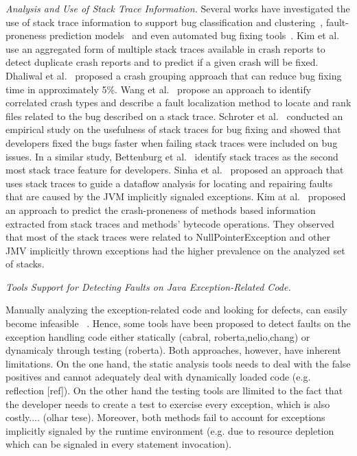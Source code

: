 \documentclass[conference]{IEEEtran}
\begin{document}
\textit{Analysis and Use of Stack Trace Information.} Several works have
investigated the use of stack trace information to support bug classification
and clustering~\cite{wang2013improving, kim2011crash, dhaliwal2011classifying},
fault-proneness prediction models~\cite{kim2013predicting} and even automated
bug fixing tools~\cite{sinha2009fault}. Kim et al.~\cite{kim2011crash} use an
aggregated form of multiple stack traces available in crash reports to detect
duplicate crash reports and to predict if a given crash will be fixed. Dhaliwal
et al.~\cite{dhaliwal2011classifying} proposed a crash grouping approach that
can reduce bug fixing time in approximately 5\%. Wang et
al.~\cite{wang2013improving} propose an approach to identify correlated crash
types and describe a fault localization method to locate and rank files related
to the bug described on a stack trace. Schroter et al.~\cite{schroter2010stack}
conducted an empirical study on the usefulness of stack traces for bug fixing
and showed that developers fixed the bugs faster when failing stack traces were
included on bug issues.  In a similar study, Bettenburg et
al.~\cite{bettenburg2008makes} identify stack traces as the second most stack
trace feature for developers.  Sinha et al.~\cite{sinha2009fault} proposed an
approach that uses stack traces to guide a dataflow analysis for locating and
repairing faults that are caused by the JVM implicitly signaled exceptions. Kim
at al.~\cite{kim2013predicting} proposed an approach to predict the
crash-proneness of methods based information extracted from stack traces and
methods' bytecode operations.  They observed that most of the stack traces were
related to NullPointerException and other JMV implicitly thrown exceptions had
the higher prevalence on the analyzed set of stacks.


\textit{Tools Support for Detecting Faults on Java Exception-Related Code.} 

Manually analyzing the exception-related code and looking for defects, can easily 
become infeasible ~\cite{Robil00}. Hence, some tools have been proposed to detect faults 
on the exception handling code either statically (cabral, roberta,nelio,chang) 
or dynamicaly through testing (roberta). Both approaches, however, have inherent
 limitations. On the one hand, the static analysis tools needs to deal with the false 
positives and cannot adequately deal with dynamically loaded code (e.g. reflection  
[ref]). On the other hand the testing tools are llimited to the fact that the developer
 needs to create a test to exercise every exception, which is also costly.... (olhar tese). 
Moreover, both methods fail to account for exceptions implicitly signaled by the runtime 
environment (e.g. due to resource depletion which can be signaled in every statement invocation). 
\end{document}
